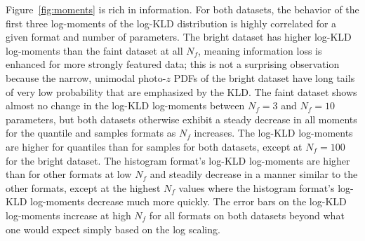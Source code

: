 \documentclass[\docopts]{\docclass}
\newcommand{\pz}{photo-$z$ PDF}
\newcommand{\mgdata}{bright\xspace}
\newcommand{\ssdata}{faint\xspace}
\begin{document}
Figure~\ref{fig:moments} is rich in information.
For both datasets, the behavior of the first three log-moments of the log-KLD 
distribution is highly correlated for a given format and number of parameters.
The \mgdata dataset has higher log-KLD log-moments than the \ssdata dataset at 
all $N_{f}$, meaning information loss is enhanced for more strongly featured 
data; this is not a surprising observation because the narrow, unimodal \pz s 
of the \mgdata dataset have long tails of very low probability that are 
emphasized by the KLD.
The \ssdata dataset shows almost no change in the log-KLD log-moments between 
$N_{f}=3$ and $N_{f}=10$ parameters, but both datasets otherwise exhibit a 
steady decrease in all moments for the quantile and samples formats as $N_{f}$ 
increases.
The log-KLD log-moments are higher for quantiles than for samples for both 
datasets, except at $N_{f}=100$ for the \mgdata dataset.
The histogram format's log-KLD log-moments are higher than for other formats at 
low $N_{f}$ and steadily decrease in a manner similar to the other formats, 
except at the highest $N_{f}$ values where the histogram format's log-KLD 
log-moments decrease much more quickly.
The error bars on the log-KLD log-moments increase at high $N_{f}$ for all 
formats on both datasets beyond what one would expect simply based on the log 
scaling.
\end{document}
